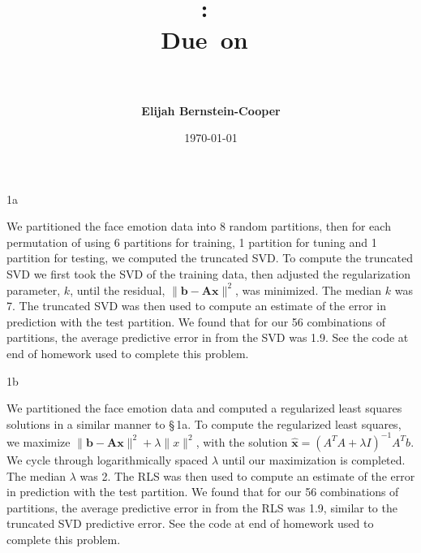 \documentclass{article}
\title{\vspace{0in}
    \textmd{\textbf{\hmwkClass:\ \hmwkTitle}}\\
    \normalsize\vspace{0.1in}\small{Due\ on\ \hmwkDueDate}\\
    \vspace{0.1in}\large{\textit{\hmwkClassInstructor\ \hmwkClassTime}}
    \vspace{0.5in}}
\author{\textbf{Elijah Bernstein-Cooper}}
\date{\today} %
\begin{document}
\maketitle

\begin{homeworkProblem}

    \begin{homeworkSection}{1a}

        We partitioned the face emotion data into 8 random partitions, then for
        each permutation of using 6 partitions for training, 1 partition for
        tuning and 1 partition for testing, we computed the truncated SVD. To
        compute the truncated SVD we first took the SVD of the training data,
        then adjusted the regularization parameter, $k$, until the residual,
        $\|\bm{b} - \bm{Ax}\|^2$, was minimized. The median $k$ was 7. The
        truncated SVD was then used to compute an estimate of the error in
        prediction with the test partition. We found that for our 56
        combinations of partitions, the average predictive error in from the
        SVD was 1.9. See the code at end of homework used to complete this
        problem.

    \end{homeworkSection}

    \begin{homeworkSection}{1b}

        We partitioned the face emotion data and computed a regularized least
        squares solutions in a similar manner to \S\,1a. To compute the
        regularized least squares, we maximize $\|\bm{b} - \bm{Ax}\|^2 +
        \lambda\|x\|^2$, with the solution $\bm{\hat{x}} = (A^T A + \lambda
        I)^{-1} A^T b$. We cycle through logarithmically spaced $\lambda$ until
        our maximization is completed. The median $\lambda$ was 2. The RLS was
        then used to compute an estimate of the error in prediction with the
        test partition. We found that for our 56 combinations of partitions,
        the average predictive error in from the RLS was 1.9, similar to the
        truncated SVD predictive error.  See the code at end of homework used
        to complete this problem.

    \end{homeworkSection}

\end{homeworkProblem}
\clearpage
\end{document}
